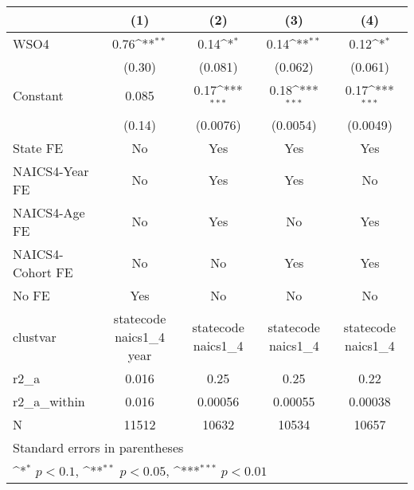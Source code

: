 {
\def\sym#1{\ifmmode^{#1}\else\(^{#1}\)\fi}
\begin{tabular}{l*{4}{c}}
\hline\hline
                    &\multicolumn{1}{c}{(1)}         &\multicolumn{1}{c}{(2)}         &\multicolumn{1}{c}{(3)}         &\multicolumn{1}{c}{(4)}         \\
\hline
WSO4                &        0.76\sym{**} &        0.14\sym{*}  &        0.14\sym{**} &        0.12\sym{*}  \\
                    &      (0.30)         &     (0.081)         &     (0.062)         &     (0.061)         \\
[1em]
Constant            &       0.085         &        0.17\sym{***}&        0.18\sym{***}&        0.17\sym{***}\\
                    &      (0.14)         &    (0.0076)         &    (0.0054)         &    (0.0049)         \\
[1em]
State FE            &          No         &         Yes         &         Yes         &         Yes         \\
[1em]
NAICS4-Year FE      &          No         &         Yes         &         Yes         &          No         \\
[1em]
NAICS4-Age FE       &          No         &         Yes         &          No         &         Yes         \\
[1em]
NAICS4-Cohort FE    &          No         &          No         &         Yes         &         Yes         \\
[1em]
No FE               &         Yes         &          No         &          No         &          No         \\
\hline
clustvar            &statecode naics1\_4 year         &statecode naics1\_4         &statecode naics1\_4         &statecode naics1\_4         \\
r2\_a                &       0.016         &        0.25         &        0.25         &        0.22         \\
r2\_a\_within         &       0.016         &     0.00056         &     0.00055         &     0.00038         \\
N                   &       11512         &       10632         &       10534         &       10657         \\
\hline\hline
\multicolumn{5}{l}{\footnotesize Standard errors in parentheses}\\
\multicolumn{5}{l}{\footnotesize \sym{*} \(p<0.1\), \sym{**} \(p<0.05\), \sym{***} \(p<0.01\)}\\
\end{tabular}
}
